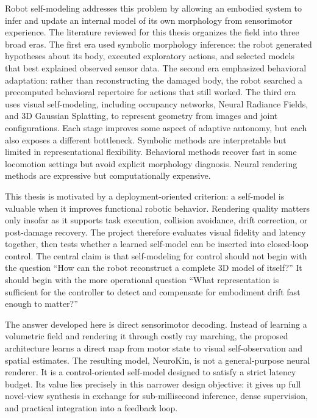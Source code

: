 \documentclass[12pt,a4paper,oneside]{report}
\begin{document}
Robot self-modeling addresses this problem by allowing an embodied system to infer and update an internal model of its own morphology from sensorimotor experience. The literature reviewed for this thesis organizes the field into three broad eras. The first era used symbolic morphology inference: the robot generated hypotheses about its body, executed exploratory actions, and selected models that best explained observed sensor data. The second era emphasized behavioral adaptation: rather than reconstructing the damaged body, the robot searched a precomputed behavioral repertoire for actions that still worked. The third era uses visual self-modeling, including occupancy networks, Neural Radiance Fields, and 3D Gaussian Splatting, to represent geometry from images and joint configurations. Each stage improves some aspect of adaptive autonomy, but each also exposes a different bottleneck. Symbolic methods are interpretable but limited in representational flexibility. Behavioral methods recover fast in some locomotion settings but avoid explicit morphology diagnosis. Neural rendering methods are expressive but computationally expensive.

This thesis is motivated by a deployment-oriented criterion: a self-model is valuable when it improves functional robotic behavior. Rendering quality matters only insofar as it supports task execution, collision avoidance, drift correction, or post-damage recovery. The project therefore evaluates visual fidelity and latency together, then tests whether a learned self-model can be inserted into closed-loop control. The central claim is that self-modeling for control should not begin with the question ``How can the robot reconstruct a complete 3D model of itself?'' It should begin with the more operational question ``What representation is sufficient for the controller to detect and compensate for embodiment drift fast enough to matter?''

The answer developed here is direct sensorimotor decoding. Instead of learning a volumetric field and rendering it through costly ray marching, the proposed architecture learns a direct map from motor state to visual self-observation and spatial estimates. The resulting model, NeuroKin, is not a general-purpose neural renderer. It is a control-oriented self-model designed to satisfy a strict latency budget. Its value lies precisely in this narrower design objective: it gives up full novel-view synthesis in exchange for sub-millisecond inference, dense supervision, and practical integration into a feedback loop.
\end{document}
